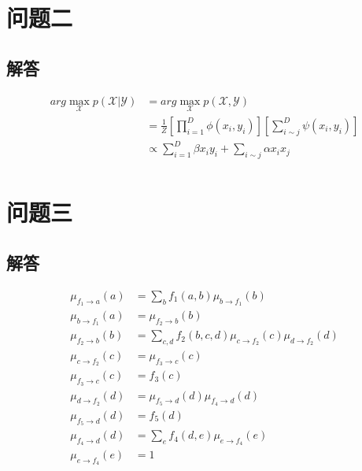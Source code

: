 \documentclass[lang=cn,12pt]{elegantpaper}
\begin{document}
\section*{问题二}

\subsection*{解答}

\begin{align*} 
	arg \mathop{max}\limits_{\mathcal X} p(\mathcal X | \mathcal Y) & = arg \mathop{max}\limits_{\mathcal X} p(\mathcal X , \mathcal Y) \\
	& = \frac{1}{Z} \left[ \prod_{i=1}^D \phi(x_i,y_i) \right] \left[ \sum_{i \sim j}^D \psi(x_i,y_i) \right] \\
	& \propto \sum_{i=1}^D \beta x_iy_i + \sum_{i \sim j} \alpha x_ix_j \\
\end{align*}

\section*{问题三}

\subsection*{解答}

\begin{align*}
	\mu_{f_1 \rightarrow a}(a) & = \sum_b f_1(a,b)\mu_{b \rightarrow f_1}(b) \\ 
	\mu_{b \rightarrow f_1}(a) & = \mu_{f_2 \rightarrow b}(b) \\ 
	\mu_{f_2 \rightarrow b}(b) & = \sum_{c,d}f_2(b,c,d)\mu_{c \rightarrow f_2}(c)\mu_{d \rightarrow f_2}(d) \\ 
	\mu_{c \rightarrow f_2}(c) & = \mu_{f_3 \rightarrow c}(c) \\
	\mu_{f_3 \rightarrow c}(c) & = f_3(c) \\
	\mu_{d \rightarrow f_2}(d) & = \mu_{f_5 \rightarrow d}(d)\mu_{f_4 \rightarrow d}(d) \\
	\mu_{f_5 \rightarrow d}(d) & = f_5(d) \\
	\mu_{f_4 \rightarrow d}(d) & = \sum_ef_4(d,e)\mu_{e \rightarrow f_4}(e) \\
	\mu_{e \rightarrow f_4}(e) & = 1
\end{align*}

% 
% 
\end{document}
